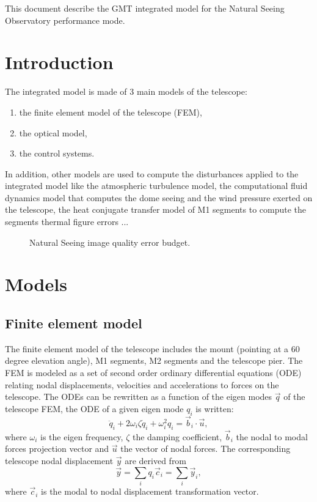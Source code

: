 \documentclass{gmto}
\begin{document}
This document describe the GMT integrated model for the Natural Seeing
Observatory performance mode\cite{ORD}.

\section{Introduction}
\label{sec:introduction}

The integrated model is made of 3 main models of the telescope:
\begin{enumerate}
\item the finite element model of the telescope (FEM),
\item the optical model,
\item the control systems.
\end{enumerate}

In addition, other models are used to compute the disturbances applied to the
integrated model like the atmospheric turbulence model, the computational fluid
dynamics model that computes the dome seeing and the wind pressure exerted on
the telescope, the heat conjugate transfer model of M1 segments to compute the
segments thermal figure errors ...

\begin{figure}
  \centering
  \caption{Natural Seeing image quality error budget.}
  \label{fig:ns-iq}
\end{figure}

\clearpage
\section{Models}
\label{sec:models}

\subsection{Finite element model}

The finite element model of the telescope\cite{ss2fem_Christoph2020} includes
the mount\cite{mount_pdr_iv} (pointing at a 60 degree elevation angle), M1 segments, M2
segments and the telescope pier.
The FEM is modeled as a set of second order ordinary differential
equations (ODE) relating nodal displacements, velocities and accelerations to
forces on the telescope.
The ODEs can be rewritten as a function of the eigen modes $\vec q$ of the telescope
FEM, the ODE of a given eigen mode $q_i$ is written:
\begin{equation}
  \label{eq:1}
  \ddot q_i + 2\omega_i\zeta\dot q_i + \omega_i^2 q_i = \vec b_i\cdot \vec u,
\end{equation}
where $\omega_i$ is the eigen frequency, $\zeta$ the damping coefficient, $\vec b_i$
the nodal to modal forces projection vector and $\vec u$ the vector of nodal forces.
The corresponding telescope nodal displacement $\vec y$ are derived from
\begin{equation}
  \label{eq:2}
  \vec y = \sum_i q_i\vec c_i  = \sum_i \vec y_i,
\end{equation}
where $\vec c_i$ is the modal to nodal displacement transformation vector.
\end{document}
